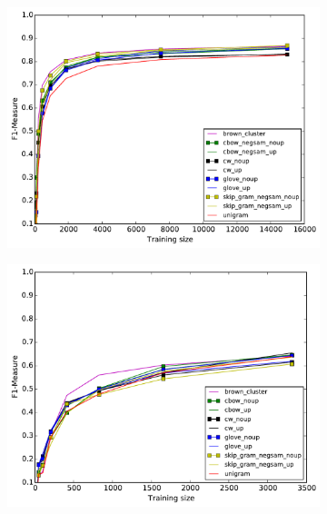 \begin{figure}[h]
\caption{Best results for each method for NER and MWE}
\centering
\begin{subfigure}{6cm}
	\centering
    	\includegraphics[scale=0.3]{plots/bestNER}
	\label{fig:bestner}
\end{subfigure}
\begin{subfigure}{6cm}
	\centering
    	\includegraphics[scale=0.3]{plots/bestMWE}
	\label{fig:bestmwe}
\end{subfigure}  	
\end{figure}  

